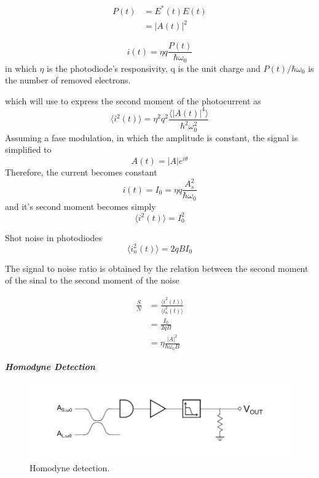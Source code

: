 \begin{align}
	P(t) &= E^{*}(t) E(t)\nonumber\\
         &= |A(t)|^2
\end{align}

\begin{equation}
	i(t) = \eta q \frac{P(t)}{\hbar \omega_0}
\end{equation}
in which $\eta$ is the photodiode's responsivity, q is the unit charge and $P(t)/\hbar \omega_0$ is the number of removed electrons.


which will use to express the second moment of the photocurrent as
\begin{equation}
	\langle i^2(t) \rangle = \eta^2 q^2 \frac{\langle |A(t)|^4 \rangle }{\hbar^2 \omega_0^2}
\end{equation}
Assuming a fase modulation, in which the amplitude is constant, the signal is simplified to
\begin{equation}
	A(t) = |A| e^{i \theta}
\end{equation}
Therefore, the current becomes constant
\begin{equation}
	i(t) = I_0 = \eta q \frac{A_s^2}{\hbar \omega_0}
\end{equation}
and it's second moment becomes simply
\begin{equation}
	\langle i^2(t) \rangle = I_0^2
\end{equation}

Shot noise in photodiodes\\

\begin{equation}
	\langle i_n^2(t) \rangle = 2 q B I_0
\end{equation}

The signal to noise ratio is obtained by the relation between the second moment of the sinal to the second moment of the noise

\begin{align}
	\frac{S}{N} &= \frac{\langle i^2(t) \rangle}{\langle i_n^2(t) \rangle} \nonumber\\
                &= \frac{I_0}{2 q B}\nonumber\\
                &= \eta \frac{ |A|^2}{\hbar \omega_0 B}
\end{align}

{\bf \em Homodyne Detection}\\

\begin{figure}[H]
	\centering
	\includegraphics{./sdf/optical_detection/figures/detection-homodyne.pdf}
	\caption{Homodyne detection.}
\end{figure}



